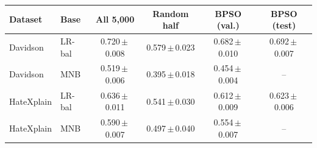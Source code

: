 \begin{tabular}{llcccc}
\toprule
Dataset & Base & All 5{,}000 & Random half & BPSO (val.) & BPSO (test) \\
\midrule
Davidson & LR-bal & 0.720\,$\pm$\,0.008 & 0.579\,$\pm$\,0.023 & 0.682\,$\pm$\,0.010 & 0.692\,$\pm$\,0.007 \\
Davidson & MNB & 0.519\,$\pm$\,0.006 & 0.395\,$\pm$\,0.018 & 0.454\,$\pm$\,0.004 & -- \\
HateXplain & LR-bal & 0.636\,$\pm$\,0.011 & 0.541\,$\pm$\,0.030 & 0.612\,$\pm$\,0.009 & 0.623\,$\pm$\,0.006 \\
HateXplain & MNB & 0.590\,$\pm$\,0.007 & 0.497\,$\pm$\,0.040 & 0.554\,$\pm$\,0.007 & -- \\
\bottomrule
\end{tabular}
